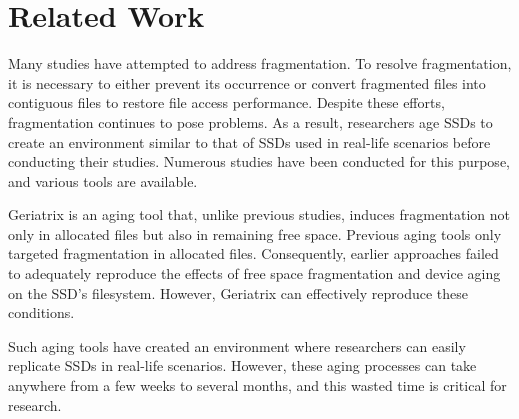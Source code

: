 \section{Related Work}
\label{s:related}

Many studies have attempted to address fragmentation.
To resolve fragmentation, it is necessary to either prevent its occurrence or convert fragmented files into contiguous files to restore file access performance.
Despite these efforts, fragmentation continues to pose problems. As a result, researchers age SSDs to create an environment similar to that of SSDs used in real-life scenarios before conducting their studies.
Numerous studies have been conducted for this purpose, and various tools are available.


Geriatrix\cite{Before_utilizer_Geriatrix} is an aging tool that, unlike previous studies, induces fragmentation not only in allocated files but also in remaining free space.
Previous aging tools only targeted fragmentation in allocated files.
Consequently, earlier approaches failed to adequately reproduce the effects of free space fragmentation and device aging on the SSD's filesystem.
However, Geriatrix can effectively reproduce these conditions.

Such aging tools have created an environment where researchers can easily replicate SSDs in real-life scenarios.
However, these aging processes can take anywhere from a few weeks to several months, and this wasted time is critical for research.
